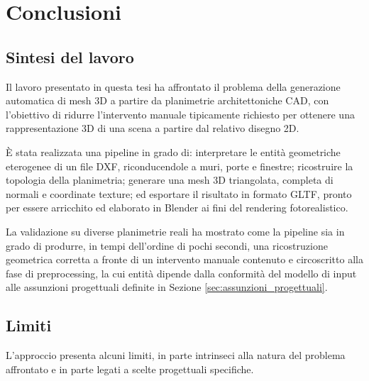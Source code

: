 \chapter{Conclusioni}
\label{ch:conclusioni}

\section{Sintesi del lavoro}
\label{sec:sintesi_lavoro}

Il lavoro presentato in questa tesi ha affrontato il problema della generazione automatica di mesh 3D a partire da planimetrie architettoniche CAD, con l'obiettivo di ridurre l'intervento manuale tipicamente richiesto per ottenere una rappresentazione 3D di una scena a partire dal relativo disegno 2D.

È stata realizzata una pipeline in grado di: interpretare le entità geometriche eterogenee di un file DXF, riconducendole a muri, porte e finestre; ricostruire la topologia della planimetria; generare una mesh 3D triangolata, completa di normali e coordinate texture; ed esportare il risultato in formato GLTF, pronto per essere arricchito ed elaborato in Blender ai fini del rendering fotorealistico.

La validazione su diverse planimetrie reali ha mostrato come la pipeline sia in grado di produrre, in tempi dell'ordine di pochi secondi, una ricostruzione geometrica corretta a fronte di un intervento manuale contenuto e circoscritto alla fase di preprocessing, la cui entità dipende dalla conformità del modello di input alle assunzioni progettuali definite in Sezione \ref{sec:assunzioni_progettuali}.

\section{Limiti}
\label{sec:limiti}

L'approccio presenta alcuni limiti, in parte intrinseci alla natura del problema affrontato e in parte legati a scelte progettuali specifiche.

